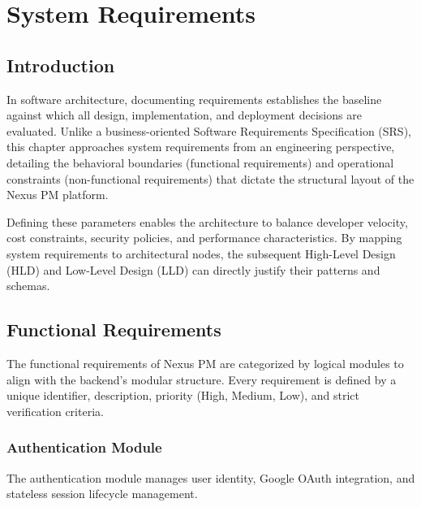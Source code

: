 \chapter{System Requirements}
\label{chap:system-requirements}

\section{Introduction}
In software architecture, documenting requirements establishes the baseline against which all design, implementation, and deployment decisions are evaluated. Unlike a business-oriented Software Requirements Specification (SRS), this chapter approaches system requirements from an engineering perspective, detailing the behavioral boundaries (functional requirements) and operational constraints (non-functional requirements) that dictate the structural layout of the Nexus PM platform.

Defining these parameters enables the architecture to balance developer velocity, cost constraints, security policies, and performance characteristics. By mapping system requirements to architectural nodes, the subsequent High-Level Design (HLD) and Low-Level Design (LLD) can directly justify their patterns and schemas.

\section{Functional Requirements}
The functional requirements of Nexus PM are categorized by logical modules to align with the backend's modular structure. Every requirement is defined by a unique identifier, description, priority (High, Medium, Low), and strict verification criteria.

\subsection{Authentication Module}
The authentication module manages user identity, Google OAuth integration, and stateless session lifecycle management.

